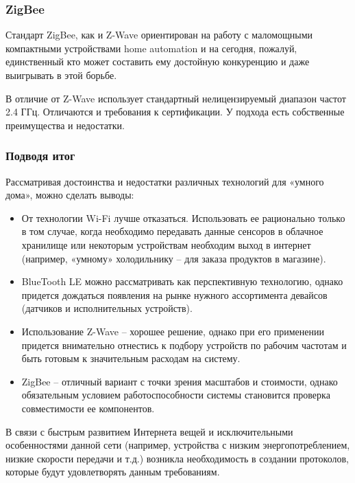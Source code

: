 \documentclass[a4paper,14pt]{extarticle}
\begin{document}
\subsubsection*{ZigBee}
Стандарт ZigBee, как и Z-Wave ориентирован на работу с маломощными компактными устройствами home automation и на сегодня, пожалуй, единственный кто может составить ему достойную конкуренцию и даже выигрывать в этой борьбе.

В отличие от Z-Wave использует стандартный нелицензируемый диапазон частот 2.4 ГГц. Отличаются и требования к сертификации. У подхода есть собственные преимущества и недостатки.
\subsubsection*{Подводя итог}
Рассматривая достоинства и недостатки различных технологий для «умного дома», можно сделать выводы:
\begin{itemize}
	\item От технологии Wi-Fi лучше отказаться. Использовать ее рационально только в том случае, когда необходимо передавать данные сенсоров в облачное хранилище или некоторым устройствам необходим выход в интернет (например, «умному» холодильнику – для заказа продуктов в магазине).
	\item BlueTooth LE можно рассматривать как перспективную технологию, однако придется дождаться появления на рынке нужного ассортимента девайсов (датчиков и исполнительных устройств).
	\item Использование Z-Wave – хорошее решение, однако при его применении придется внимательно отнестись к подбору устройств по рабочим частотам и быть готовым к значительным расходам на систему.
	\item ZigBee – отличный вариант с точки зрения масштабов и стоимости, однако обязательным условием работоспособности системы становится проверка совместимости ее компонентов.
\end{itemize}

\if
В связи с быстрым развитием Интернета вещей и исключительными особенностями данной сети (например, устройства с низким энергопотреблением, низкие скорости передачи и т.д.) возникла необходимость в создании протоколов, которые будут удовлетворять данным требованиям. 
\end{document}

